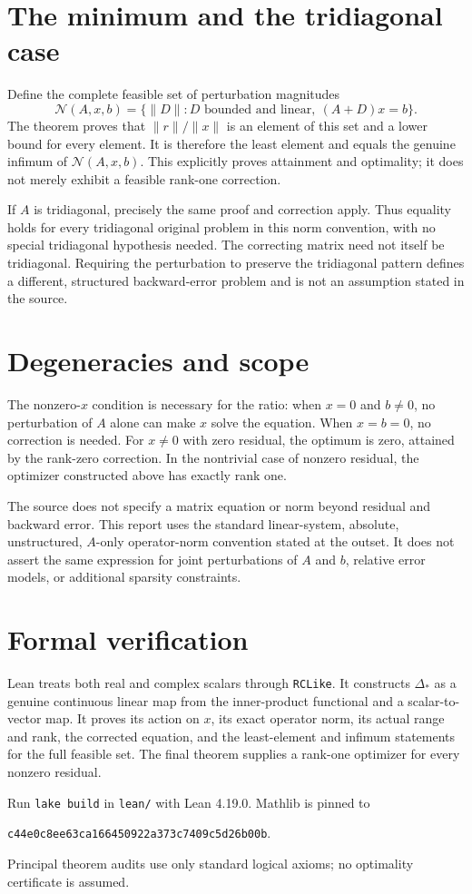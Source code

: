\documentclass[11pt]{article}
\begin{document}
\section*{The minimum and the tridiagonal case}
Define the complete feasible set of perturbation magnitudes
\[
 \mathcal N(A,x,b)=\{\|D\|:D\text{ bounded and linear},\ (A+D)x=b\}.
\]
The theorem proves that $\|r\|/\|x\|$ is an element of this set and a lower bound for every element. It is therefore the least element and equals the genuine infimum of $\mathcal N(A,x,b)$. This explicitly proves attainment and optimality; it does not merely exhibit a feasible rank-one correction.

If $A$ is tridiagonal, precisely the same proof and correction apply. Thus equality holds for every tridiagonal original problem in this norm convention, with no special tridiagonal hypothesis needed. The correcting matrix need not itself be tridiagonal. Requiring the perturbation to preserve the tridiagonal pattern defines a different, structured backward-error problem and is not an assumption stated in the source.

\section*{Degeneracies and scope}
The nonzero-$x$ condition is necessary for the ratio: when $x=0$ and $b\ne0$, no perturbation of $A$ alone can make $x$ solve the equation. When $x=b=0$, no correction is needed. For $x\ne0$ with zero residual, the optimum is zero, attained by the rank-zero correction. In the nontrivial case of nonzero residual, the optimizer constructed above has exactly rank one.

The source does not specify a matrix equation or norm beyond residual and backward error. This report uses the standard linear-system, absolute, unstructured, $A$-only operator-norm convention stated at the outset. It does not assert the same expression for joint perturbations of $A$ and $b$, relative error models, or additional sparsity constraints.

\section*{Formal verification}
Lean treats both real and complex scalars through \texttt{RCLike}. It constructs $\Delta_*$ as a genuine continuous linear map from the inner-product functional and a scalar-to-vector map. It proves its action on $x$, its exact operator norm, its actual range and rank, the corrected equation, and the least-element and infimum statements for the full feasible set. The final theorem supplies a rank-one optimizer for every nonzero residual.

Run \texttt{lake build} in \texttt{lean/} with Lean 4.19.0. Mathlib is pinned to
\begin{center}\small\texttt{c44e0c8ee63ca166450922a373c7409c5d26b00b}.\end{center}
Principal theorem audits use only standard logical axioms; no optimality certificate is assumed.
\end{document}
